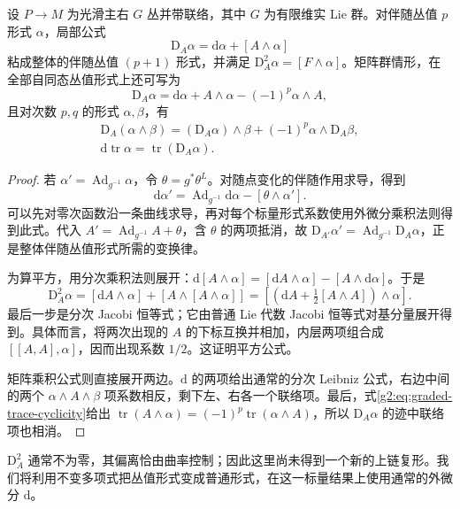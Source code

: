 \begin{proposition}\label{g2:prop:covariant-form-calculus}
	设 \(P\to M\) 为光滑主右 \(G\) 丛并带联络，其中 \(G\) 为有限维实 Lie 群。对伴随丛值 \(p\) 形式 \(\alpha\)，局部公式
	\begin{equation}\label{g2:eq:adjoint-covariant-form-derivative}
		\mathrm D_A\alpha=\mathrm d\alpha+[A\wedge\alpha]
	\end{equation}
	粘成整体的伴随丛值 \((p+1)\) 形式，并满足 \(\mathrm D_A^2\alpha=[F\wedge\alpha]\)。矩阵群情形，在全部自同态丛值形式上还可写为
	\[
		\mathrm D_A\alpha=\mathrm d\alpha+A\wedge\alpha-(-1)^p\alpha\wedge A,
	\]
	且对次数 \(p,q\) 的形式 \(\alpha,\beta\)，有
	\[
	\begin{gathered}
		\mathrm D_A(\alpha\wedge\beta)
		=(\mathrm D_A\alpha)\wedge\beta+(-1)^p\alpha\wedge\mathrm D_A\beta,\\
		\mathrm d\operatorname{tr}\alpha=\operatorname{tr}(\mathrm D_A\alpha).
	\end{gathered}
	\]
\end{proposition}
\begin{proof}
	若 \(\alpha'=\operatorname{Ad}_{g^{-1}}\alpha\)，令 \(\theta=g^*\theta^L\)。对随点变化的伴随作用求导，得到
	\[
		\mathrm d\alpha'=\operatorname{Ad}_{g^{-1}}\mathrm d\alpha-[\theta\wedge\alpha'].
	\]
	可以先对零次函数沿一条曲线求导，再对每个标量形式系数使用外微分乘积法则得到此式。代入 \(A'=\operatorname{Ad}_{g^{-1}}A+\theta\)，含 \(\theta\) 的两项抵消，故 \(\mathrm D_{A'}\alpha'=\operatorname{Ad}_{g^{-1}}\mathrm D_A\alpha\)，正是整体伴随丛值形式所需的变换律。

	为算平方，用分次乘积法则展开：\(\mathrm d[A\wedge\alpha]=[\mathrm dA\wedge\alpha]-[A\wedge\mathrm d\alpha]\)。于是
	\[
		\mathrm D_A^2\alpha=[\mathrm dA\wedge\alpha]+[A\wedge[A\wedge\alpha]]
		=\left[\left(\mathrm dA+\tfrac12[A\wedge A]\right)\wedge\alpha\right].
	\]
	最后一步是分次 Jacobi 恒等式；它由普通 Lie 代数 Jacobi 恒等式对基分量展开得到。具体而言，将两次出现的 \(A\) 的下标互换并相加，内层两项组合成 \([[A,A],\alpha]\)，因而出现系数 \(1/2\)。这证明平方公式。

	矩阵乘积公式则直接展开两边。\(\mathrm d\) 的两项给出通常的分次 Leibniz 公式，右边中间的两个 \(\alpha\wedge A\wedge\beta\) 项系数相反，剩下左、右各一个联络项。最后，式\eqref{g2:eq:graded-trace-cyclicity}给出 \(\operatorname{tr}(A\wedge\alpha)=(-1)^p\operatorname{tr}(\alpha\wedge A)\)，所以 \(\mathrm D_A\alpha\) 的迹中联络项也相消。
\end{proof}

\(\mathrm D_A^2\) 通常不为零，其偏离恰由曲率控制；因此这里尚未得到一个新的上链复形。我们将利用不变多项式把丛值形式变成普通形式，在这一标量结果上使用通常的外微分 \(\mathrm d\)。

